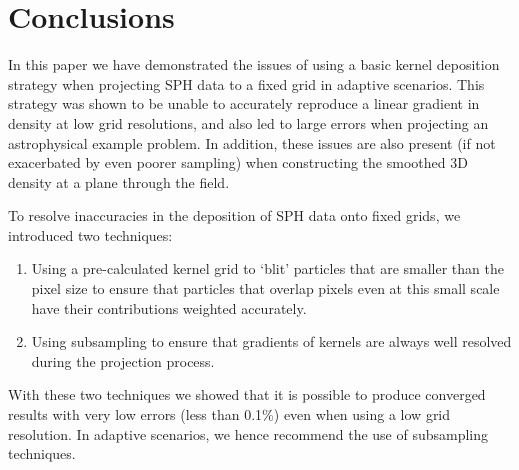 \section{Conclusions}

In this paper we have demonstrated the issues of using a basic kernel deposition strategy when projecting SPH data to a fixed grid in adaptive scenarios. This strategy was shown to be unable to accurately reproduce a linear gradient in density at low grid resolutions, and also led to large errors when projecting an astrophysical example problem. In addition, these issues are also present (if not exacerbated by even poorer sampling) when constructing the smoothed 3D density at a plane through the field.

To resolve inaccuracies in the deposition of SPH data onto fixed grids, we introduced two techniques:
\begin{enumerate}
  \item Using a pre-calculated kernel grid to `blit' particles that are smaller than the pixel size to ensure that particles that overlap pixels even at this small scale have their contributions weighted accurately.
  \item Using subsampling to ensure that gradients of kernels are always well resolved during the projection process.
\end{enumerate}
With these two techniques we showed that it is possible to produce converged results with very low errors (less than 0.1\%) even when using a low grid resolution. In adaptive scenarios, we hence recommend the use of subsampling techniques.